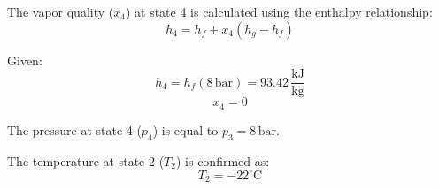 The vapor quality (\(x_4\)) at state 4 is calculated using the enthalpy relationship:  
\[
h_4 = h_f + x_4(h_g - h_f)
\]  

Given:  
\[
h_4 = h_f(8 \, \text{bar}) = 93.42 \, \frac{\text{kJ}}{\text{kg}}
\]  
\[
x_4 = 0
\]  

The pressure at state 4 (\(p_4\)) is equal to \(p_3 = 8 \, \text{bar}\).  

The temperature at state 2 (\(T_2\)) is confirmed as:  
\[
T_2 = -22^\circ\text{C}
\]